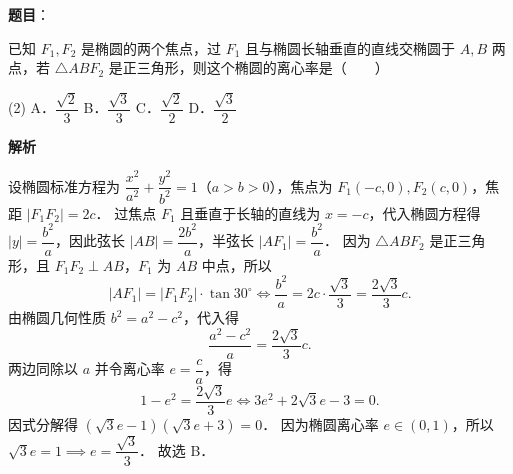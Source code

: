 \begin{answer}

\textbf{题目}：

已知 $F_1, F_2$ 是椭圆的两个焦点，过 $F_1$ 且与椭圆长轴垂直的直线交椭圆于 $A, B$ 两点，若 $\triangle ABF_2$ 是正三角形，则这个椭圆的离心率是\mbox{（　　）}

\begin{gkopts}(2)
\task A．$\dfrac{\sqrt{2}}{3}$
\task B．$\dfrac{\sqrt{3}}{3}$
\task C．$\dfrac{\sqrt{2}}{2}$
\task D．$\dfrac{\sqrt{3}}{2}$
\end{gkopts}

\textbf{解析}

设椭圆标准方程为 $\dfrac{x^2}{a^2} + \dfrac{y^2}{b^2} = 1$（$a > b > 0$），焦点为 $F_1(-c, 0), F_2(c, 0)$，焦距 $|F_1F_2| = 2c$．
过焦点 $F_1$ 且垂直于长轴的直线为 $x = -c$，代入椭圆方程得 $|y| = \dfrac{b^2}{a}$，因此弦长 $|AB| = \dfrac{2b^2}{a}$，半弦长 $|AF_1| = \dfrac{b^2}{a}$．
因为 $\triangle ABF_2$ 是正三角形，且 $F_1F_2 \perp AB$，$F_1$ 为 $AB$ 中点，所以
\nopagebreak[4]
\[
|AF_1| = |F_1F_2| \cdot \tan 30^\circ \iff \frac{b^2}{a} = 2c \cdot \frac{\sqrt{3}}{3} = \frac{2\sqrt{3}}{3}c.
\]
由椭圆几何性质 $b^2 = a^2 - c^2$，代入得
\nopagebreak[4]
\[
\frac{a^2 - c^2}{a} = \frac{2\sqrt{3}}{3}c.
\]
两边同除以 $a$ 并令离心率 $e = \dfrac{c}{a}$，得
\nopagebreak[4]
\[
1 - e^2 = \frac{2\sqrt{3}}{3}e \iff 3e^2 + 2\sqrt{3}e - 3 = 0.
\]
因式分解得 $(\sqrt{3}e - 1)(\sqrt{3}e + 3) = 0$．
因为椭圆离心率 $e \in (0, 1)$，所以 $\sqrt{3}e = 1 \implies e = \dfrac{\sqrt{3}}{3}$．
故选 B．


\end{answer}
